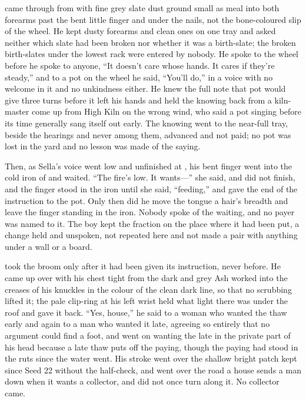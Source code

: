  came through from  with fine grey slate dust ground small as meal into both forearms past the bent little finger and under the nails, not the bone-coloured slip of the wheel. He kept dusty forearms and clean ones on one tray and asked neither which slate had been broken nor whether it was a birth-slate; the broken birth-slates under the lowest rack were entered by nobody. He spoke to the wheel before he spoke to anyone, “It doesn't care whose hands. It cares if they're steady,” and to a pot on the wheel he said, “You'll do,” in a voice with no welcome in it and no unkindness either. He knew the full note that pot would give three turns before it left his hands and held the knowing back from a kiln-master come up from High Kiln on the wrong wind, who said a pot singing before its time generally sang itself out early. The knowing went to the near-full tray, beside the hearings and never among them, advanced and not paid; no pot was lost in the yard and no lesson was made of the saying.

Then, as Sella's voice went low and unfinished at , his bent finger went into the cold iron of  and waited. “The fire's low. It wants---” she said, and did not finish, and the finger stood in the iron until she said, “feeding,” and gave the end of the instruction to the pot. Only then did he move the tongue a hair's breadth and leave the finger standing in the iron. Nobody spoke of the waiting, and no payer was named to it. The boy kept the fraction on the place where it had been put, a change held and unspoken, not repeated here and not made a pair with anything under a wall or a board.

 took the broom only after it had been given its instruction, never before. He came up over  with his chest tight from the dark and grey Ash worked into the creases of his knuckles in the colour of the clean dark line, so that no scrubbing lifted it; the pale clip-ring at his left wrist held what light there was under the roof and gave it back. “Yes, house,” he said to a woman who wanted the thaw early and again to a man who wanted it late, agreeing so entirely that no argument could find a foot, and went on wanting the late in the private part of his head because a late thaw puts off the paying, though the paying had stood in the ruts since the water went. His stroke went over the shallow bright patch kept since Seed 22 without the half-check, and went over the road a house sends a man down when it wants a collector, and did not once turn along it. No collector came.

